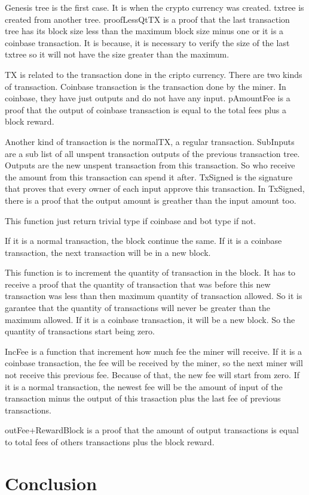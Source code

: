 \documentclass[12pt]{article}
\begin{document}
Genesis tree is the first case.
It is when the crypto currency was created.
txtree is created from another tree.
proofLessQtTX is a proof that the last transaction tree has its block size less than the maximum block size minus one or it is a coinbase transaction.
It is because, it is necessary to verify the size of the last txtree so it will not have the size greater than the maximum.


TX is related to the transaction done in the cripto currency.
There are two kinds of transaction.
Coinbase transaction is the transaction done by the miner.
In coinbase, they have just outputs and do not have any input.
pAmountFee is a proof that the output of coinbase transaction is equal to the total fees plus
a block reward.

Another kind of transaction is the normalTX, a regular transaction.
SubInputs are a sub list of all unspent transaction outputs of the previous transaction tree.
Outputs are the new unspent transaction from this transaction.
So who receive the amount from this transaction can spend it after.
TxSigned is the signature that proves that every owner of each input approve this transaction.
In TxSigned, there is a proof that the output amount is greather than the input amount too.


This function just return trivial type if coinbase and bot type if not.


If it is a normal transaction, the block continue the same.
If it is a coinbase transaction, the next transaction will be in a new block.


This function is to increment the quantity of transaction in the block.
It has to receive a proof that the quantity of transaction that was before this new transaction was
less than then maximum quantity of transaction allowed.
So it is garantee that the quantity of transactions will never be greater than the maximum allowed.
If it is a coinbase transaction, it will be a new block.
So the quantity of transactions start being zero.


IncFee is a function that increment how much fee the miner will receive.
If it is a coinbase transaction, the fee will be received by the miner, so the next miner will not receive
this previous fee.
Because of that, the new fee will start from zero.
If it is a normal transaction, the newest fee will be the amount of input of the transaction minus
the output of this trasaction plus the last fee of previous transactions.


outFee+RewardBlock is a proof that the amount of output transactions is equal to total fees of
others transactions plus the block reward.


\section{Conclusion}

\newpage
 


\end{document}
